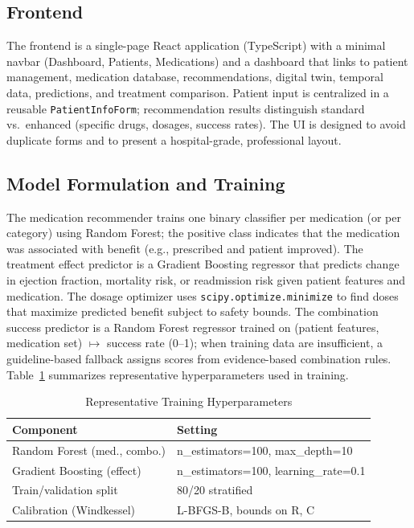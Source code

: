 \documentclass[conference]{IEEEtran}
\begin{document}
\subsection{Frontend}
The frontend is a single-page React application (TypeScript) with a minimal navbar (Dashboard, Patients, Medications) and a dashboard that links to patient management, medication database, recommendations, digital twin, temporal data, predictions, and treatment comparison. Patient input is centralized in a reusable \texttt{PatientInfoForm}; recommendation results distinguish standard vs.\ enhanced (specific drugs, dosages, success rates). The UI is designed to avoid duplicate forms and to present a hospital-grade, professional layout.

\subsection{Model Formulation and Training}
The medication recommender trains one binary classifier per medication (or per category) using Random Forest; the positive class indicates that the medication was associated with benefit (e.g., prescribed and patient improved). The treatment effect predictor is a Gradient Boosting regressor that predicts change in ejection fraction, mortality risk, or readmission risk given patient features and medication. The dosage optimizer uses \texttt{scipy.optimize.minimize} to find doses that maximize predicted benefit subject to safety bounds. The combination success predictor is a Random Forest regressor trained on (patient features, medication set) $\mapsto$ success rate (0--1); when training data are insufficient, a guideline-based fallback assigns scores from evidence-based combination rules. Table~\ref{tab:hyper} summarizes representative hyperparameters used in training.

\begin{table}[t]
\caption{Representative Training Hyperparameters}
\label{tab:hyper}
\centering
\footnotesize
\begin{tabular}{@{}p{}p{}@{}}
\toprule
\textbf{Component} & \textbf{Setting} \\
\midrule
Random Forest (med., combo.) & n\_estimators=100, max\_depth=10 \\
Gradient Boosting (effect) & n\_estimators=100, learning\_rate=0.1 \\
Train/validation split & 80/20 stratified \\
Calibration (Windkessel) & L-BFGS-B, bounds on R, C \\
\bottomrule
\end{tabular}
\end{table}
\end{document}
